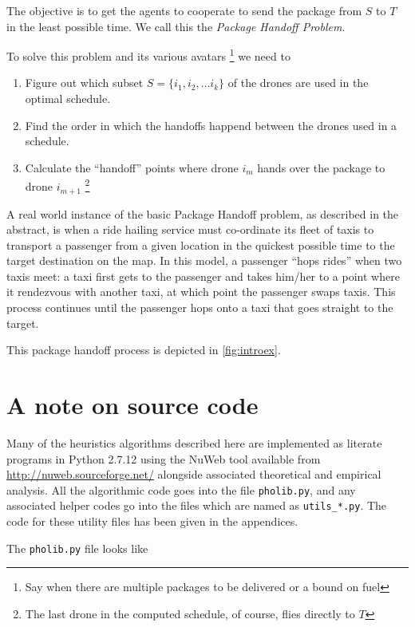 \documentclass[10pt, english, oneside]{report}
\begin{document}
The objective is to get the agents to cooperate to send the package from $S$ to $T$ in the 
least possible time. We call this the \textit{Package Handoff Problem}. 

To solve this problem and its various avatars 
\footnote{Say when there are multiple packages to be delivered or a bound on fuel} 
we need to 


\begin{enumerate}
\item Figure out which subset $S = \{i_1, i_2, \ldots i_k\}$ of the drones are used in the optimal schedule. 
\item Find the order in which the handoffs happend between the drones used in a schedule. 
\item Calculate the ``handoff'' points where drone $i_m$ hands over the package to drone $i_{m+1}$ 
\footnote{The last drone in the computed schedule, of course, flies directly to $T$}
\end{enumerate}

A real world instance of the basic Package Handoff problem, as described in the abstract, is when a 
ride hailing service  must co-ordinate its fleet of taxis to transport a passenger from a given location 
in the quickest possible time to the target destination on the map. In this model, 
a passenger ``hops rides'' when two taxis meet: a taxi first gets to the passenger and takes him/her to 
a point where it rendezvous with another taxi, at which point the passenger swaps taxis. This process continues 
until the passenger hops onto a taxi that goes straight to the target.  

This package handoff process is depicted in \autoref{fig:introex}. 


\section{A note on source code}
Many of the heuristics algorithms described here are implemented as literate programs \cite{Knuth:1984:LP:473.479} 
in Python 2.7.12 using the NuWeb tool \cite{briggs1992nuweb} available from \url{http://nuweb.sourceforge.net/}
alongside associated theoretical and empirical analysis. All the algorithmic code goes into the 
file \verb|pholib.py|, and any associated helper codes go into the files which are named as \verb|utils_*.py|. 
The code for these utility files has been given in the appendices. 

The \verb|pholib.py| file looks like 
\end{document}
